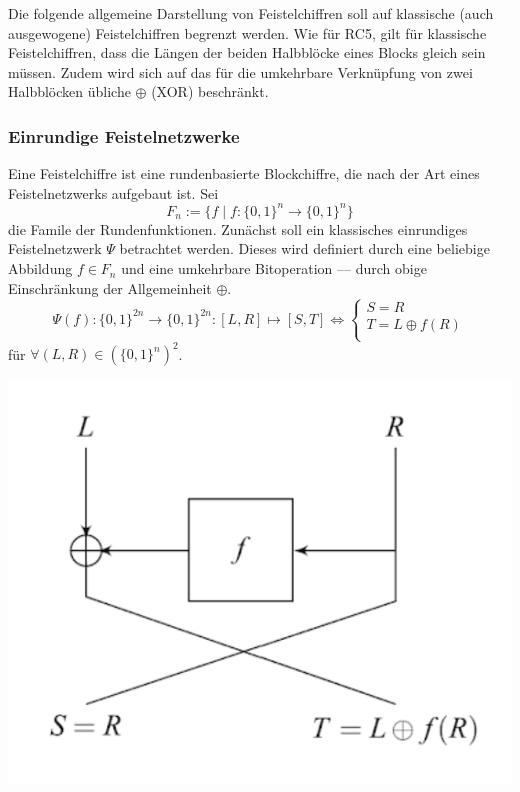 \documentclass[course=erap]{aspdoc}
\begin{document}
Die folgende allgemeine Darstellung von Feistelchiffren soll auf klassische (auch ausgewogene) Feistelchiffren begrenzt werden. Wie für RC5, gilt für klassische Feistelchiffren, dass die Längen der beiden Halbblöcke eines Blocks gleich sein müssen. Zudem wird sich auf das für die umkehrbare Verknüpfung von zwei Halbblöcken übliche $\oplus$ (XOR) beschränkt.

\subsubsection{Einrundige Feistelnetzwerke}

Eine Feistelchiffre ist eine rundenbasierte Blockchiffre, die nach der Art eines Feistelnetzwerks aufgebaut ist. Sei
\[
    F_n := \{f \mid f \colon \{0, 1\}^n \to \{0, 1\}^n\}
\]
die Famile der Rundenfunktionen. Zunächst soll ein klassisches einrundiges Feistelnetzwerk $\Psi$ betrachtet werden. Dieses wird definiert durch eine beliebige Abbildung $f \in F_n$ und eine umkehrbare Bitoperation --- durch obige Einschränkung der Allgemeinheit $\oplus$.
\[
    \Psi(f) \colon \{0, 1\}^{2n} \to \{0, 1\}^{2n} \colon [L, R] \mapsto [S, T] \Leftrightarrow
        \begin{cases}
            S = R \\
            T = L \oplus f(R) \\
        \end{cases}
\]
für $\forall(L, R) \in (\{0, 1\}^n)^2$.\cite[p.11]{nachef}

\begin{center}
    \includegraphics[scale=1]{img/1_round_feistel_cipher_enc.png}\break
    \cite[Fig. 2.1]{nachef}
\end{center}
\end{document}
